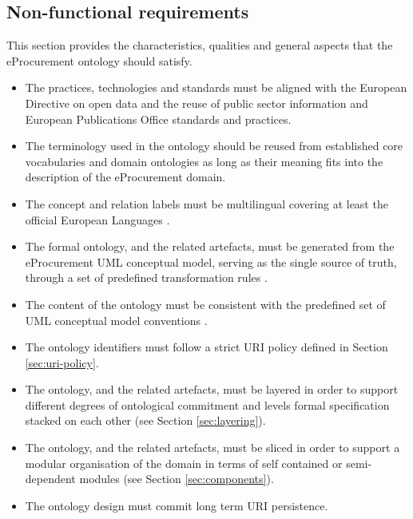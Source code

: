 	
	\subsection{Non-functional requirements}
	\label{sec:non-functional-requirements}
	
	This section provides the characteristics, qualities and general aspects that the eProcurement ontology should satisfy.
	
	\begin{itemize}
		\item The practices, technologies and standards must be aligned with the European Directive on open data and the reuse of public sector information \citep{directive-2019/1024} and European Publications Office standards and practices.
		\item The terminology used in the ontology should be reused from established core vocabularies \cite{isaHandbook2015} and domain ontologies as long as their meaning fits into the description of the eProcurement domain.
		\item The concept and relation labels must be multilingual covering at least the official European Languages \cite{styleguide-eu}.
		\item The formal ontology, and the related artefacts, must be generated from the eProcurement UML conceptual model, serving as the single source of truth, through a set of predefined transformation rules \citep{costetchi2020c}. 
		\item The content of the ontology must be consistent with the predefined set of UML conceptual model conventions \cite{costetchi2020b}.
		\item The ontology identifiers must follow a strict URI policy defined in Section \ref{sec:uri-policy}.
		\item The ontology, and the related artefacts, must be layered in order to support different degrees of ontological commitment and levels formal specification stacked on each other (see Section \ref{sec:layering}).
		\item The ontology, and the related artefacts,  must be sliced in order to support a modular organisation of the domain in terms of self contained or semi-dependent modules (see Section \ref{sec:components}).
		\item The ontology design must commit long term URI persistence.
		
		
		
	\end{itemize}
	
